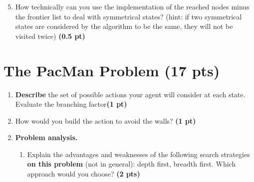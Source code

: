 \documentclass[11pt,a4paper]{../template/report}
\begin{document}
\begin{answer}
\end{answer}



\begin{enumerate}
\setcounter{enumi}{4}
    \item How technically can you use the implementation of the reached nodes minus the frontier list to deal with symmetrical states? (hint: if two symmetrical states are considered by the algorithm to be the same, they will not be visited twice) \textbf{(0.5 pt)}
\end{enumerate}

\begin{answer}
\end{answer}




\section{The 
PacMan Problem (17 pts)}

\begin{enumerate}
\setcounter{enumi}{1}
\begin{enumerate}
\item \textbf{Describe} the set of possible actions your agent will consider at each state. Evaluate the branching factor\textbf{(1 pt)}
\end{enumerate}
  
\end{enumerate}

\begin{answer}
\end{answer}
\begin{enumerate}
\setcounter{enumi}{1}
\begin{enumerate}
\setcounter{enumii}{1}
    \item  How would you build the action to avoid the walls? \textbf{(1 pt)}
\end{enumerate}
  
\end{enumerate}

\begin{answer}
\end{answer}



\begin{enumerate}
\setcounter{enumi}{1}
    \item \textbf{Problem analysis.}
    \begin{enumerate}
        \item Explain the advantages and weaknesses of the following search strategies \textbf{on this problem} (not in general): depth first, breadth first. Which approach would you choose? \textbf{(2 pts)}
    \end{enumerate}
\end{enumerate}
\end{document}
